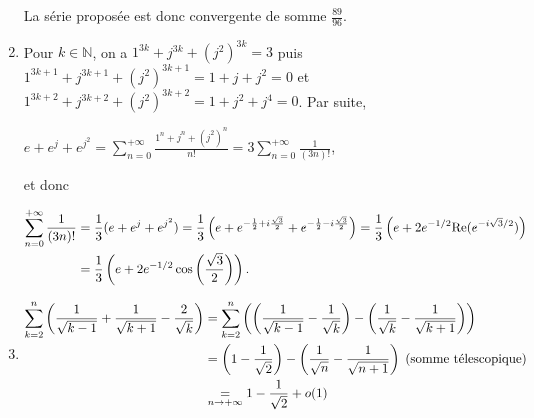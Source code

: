 \documentclass[11pt,a4paper]{article}
\newcommand{\Nn}{\mathbb{N}} \newcommand{\N}{\mathbb{N}}
\begin{document}
\begin{enumerate}
La série proposée est donc convergente de somme $\frac{89}{96}$.

\begin{center}
\end{center}

\item  Pour $k\in\Nn$, on a $1^{3k}+j^{3k}+(j^2)^{3k}=3$ puis $1^{3k+1}+j^{3k+1}+(j^2)^{3k+1} =1+j+j^2= 0$ et $1^{3k+2}+j^{3k+2}+(j^2)^{3k+2}=1+j^2 + j^4 = 0$. Par suite,

\begin{center}
$e+e^j+e^{j^2}=\sum_{n=0}^{+\infty}\frac{1^n+j^n+(j^2)^n}{n!}=3\sum_{n=0}^{+\infty}\frac{1}{(3n)!}$,
\end{center}

et donc

\begin{align*}\ensuremath
\sum_{n=0}^{+\infty}\frac{1}{(3n)!}&=\frac{1}{3}(e+e^j+e^{j^2})=\frac{1}{3}\left(e+e^{-\frac{1}{2}+i\frac{\sqrt{3}}{2}}+e^{-\frac{1}{2}-i\frac{\sqrt{3}}{2}}\right) =\frac{1}{3}\left(e + 2e^{-1/2}\text{Re}(e^{-i\sqrt{3}/2})\right)\\
 &=\frac{1}{3}\left(e +2e^{-1/2}\cos\left(\frac{\sqrt{3}}{2}\right)\right).
\end{align*}

\begin{center}
\end{center}

\item 

\begin{align*}\ensuremath
\sum_{k=2}^{n}\left(\frac{1}{\sqrt{k-1}}+\frac{1}{\sqrt{k+1}}-\frac{2}{\sqrt{k}}\right)&=\sum_{k=2}^{n}\left(\left(\frac{1}{\sqrt{k-1}}-\frac{1}{\sqrt{k}}\right)-\left(\frac{1}{\sqrt{k}}-\frac{1}{\sqrt{k+1}}\right)\right)\\
 &=\left(1-\frac{1}{\sqrt{2}}\right)-\left(\frac{1}{\sqrt{n}}-\frac{1}{\sqrt{n+1}}\right)\;(\text{somme télescopique})\\
 &\underset{n\rightarrow+\infty}{=}1-\frac{1}{\sqrt{2}}+o(1) 
\end{align*}

\begin{center}
\end{center}


\end{enumerate}
\end{document}
